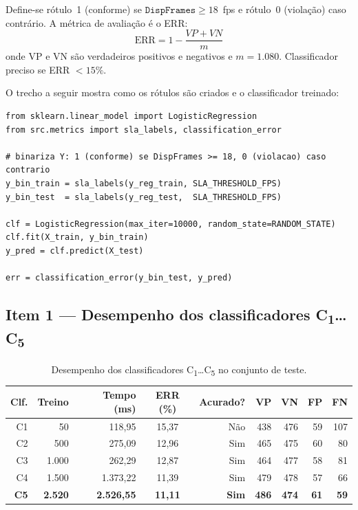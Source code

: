 \documentclass[12pt,a4paper]{article}
\begin{document}
Define-se rótulo~1 (conforme) se $\texttt{DispFrames} \geq 18$~fps e rótulo~0
(violação) caso contrário. A métrica de avaliação é o ERR:
\begin{equation}
  \text{ERR} = 1 - \frac{VP + VN}{m}
\end{equation}
onde VP e VN são verdadeiros positivos e negativos e $m = 1.080$. Classificador
preciso se ERR $< 15\%$.

O trecho a seguir mostra como os rótulos são criados e o classificador treinado:

\begin{lstlisting}[caption={Criação de rótulos e treinamento do classificador logístico (Task~III).}]
from sklearn.linear_model import LogisticRegression
from src.metrics import sla_labels, classification_error

# binariza Y: 1 (conforme) se DispFrames >= 18, 0 (violacao) caso contrario
y_bin_train = sla_labels(y_reg_train, SLA_THRESHOLD_FPS)
y_bin_test  = sla_labels(y_reg_test,  SLA_THRESHOLD_FPS)

clf = LogisticRegression(max_iter=10000, random_state=RANDOM_STATE)
clf.fit(X_train, y_bin_train)
y_pred = clf.predict(X_test)

err = classification_error(y_bin_test, y_pred)
\end{lstlisting}

\subsection{Item 1 --- Desempenho dos classificadores C\textsubscript{1}\ldots{}C\textsubscript{5}}

\begin{table}[H]
\centering
\caption{Desempenho dos classificadores C\textsubscript{1}\ldots{}C\textsubscript{5} no conjunto de teste.}
\label{tab:clf_results}
\renewcommand{\arraystretch}{1.2}
\begin{tabular}{rrrcrrrrr}
\toprule
\textbf{Clf.} & \textbf{Treino} & \textbf{Tempo (ms)} & \textbf{ERR (\%)} & \textbf{Acurado?} & \textbf{VP} & \textbf{VN} & \textbf{FP} & \textbf{FN} \\
\midrule
C1 &    50 &   118{,}95 & 15{,}37 & N\~{a}o & 438 & 476 & 59 & 107 \\
C2 &   500 &   275{,}09 & 12{,}96 & Sim     & 465 & 475 & 60 &  80 \\
C3 & 1.000 &   262{,}29 & 12{,}87 & Sim     & 464 & 477 & 58 &  81 \\
C4 & 1.500 & 1.373{,}22 & 11{,}39 & Sim     & 479 & 478 & 57 &  66 \\
\textbf{C5} & \textbf{2.520} & \textbf{2.526{,}55} & \textbf{11{,}11} & \textbf{Sim} & \textbf{486} & \textbf{474} & \textbf{61} & \textbf{59} \\
\bottomrule
\end{tabular}
\end{table}
\end{document}
